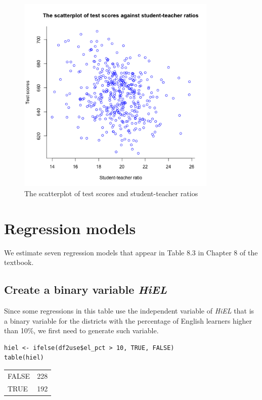 \documentclass[11pt]{article}
\begin{document}
\begin{figure}[htbp]
\centering
\includegraphics[width=0.85\textwidth]{img/scplot.png}
\caption{The scatterplot of test scores and student-teacher ratios}
\end{figure}

\section{Regression models}
\label{sec:org215456b}
We estimate seven regression models that appear in Table 8.3 in
Chapter 8 of the textbook.

\subsection*{Create a binary variable \emph{HiEL}}
\label{sec:org1c4f719}

Since some regressions in this table use
the independent variable of \emph{HiEL} that is a binary variable for the
districts with the percentage of English learners higher than 10\%, we
first need to generate such variable.

\begin{verbatim}
hiel <- ifelse(df2use$el_pct > 10, TRUE, FALSE)
table(hiel)
\end{verbatim}

\begin{center}
\begin{tabular}{lr}
FALSE & 228\\
TRUE & 192\\
\end{tabular}
\end{center}
\end{document}
